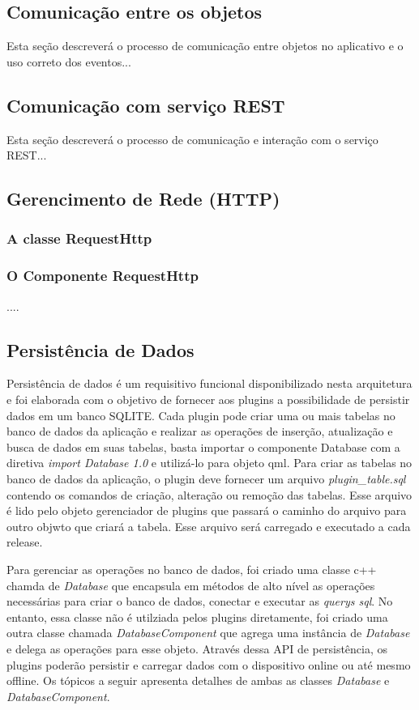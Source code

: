 \subsection{Comunicação entre os objetos}
Esta seção descreverá o processo de comunicação entre objetos no aplicativo e o uso correto dos eventos...


\subsection{Comunicação com serviço REST}
Esta seção descreverá o processo de comunicação e interação com o serviço REST...


\subsection{Gerencimento de Rede (HTTP)}\label{sec:solucao-desenvolvida}
\subsubsection{A classe RequestHttp}\label{sec:solucao-desenvolvida}
\subsubsection{O Componente RequestHttp}\label{sec:solucao-desenvolvida}
....


\subsection{Persistência de Dados}\label{sec:solucao-desenvolvida}
Persistência de dados é um requisitivo funcional disponibilizado nesta arquitetura e foi elaborada com o objetivo de fornecer aos plugins a possibilidade de persistir dados em um banco SQLITE. Cada plugin pode criar uma ou mais tabelas no banco de dados da aplicação e realizar as operações de inserção, atualização e busca de dados em suas tabelas, basta importar o componente Database com a diretiva \textit{import Database 1.0} e utilizá-lo para objeto qml. Para criar as tabelas no banco de dados da aplicação, o plugin deve fornecer um arquivo \textit{plugin\_table.sql} contendo os comandos de criação, alteração ou remoção das tabelas. Esse arquivo é lido pelo objeto gerenciador de plugins que passará o caminho do arquivo para outro objwto que criará a tabela. Esse arquivo será carregado e executado a cada release.\par

Para gerenciar as operações no banco de dados, foi criado uma classe c++ chamda de \textit{Database} que encapsula em métodos de alto nível as operações necessárias para criar o banco de dados, conectar e executar as \textit{querys sql}. No entanto, essa classe não é utilziada pelos plugins diretamente, foi criado uma outra classe chamada \textit{DatabaseComponent} que agrega uma instância de \textit{Database} e delega as operações para esse objeto. Através dessa API de persistência, os plugins poderão persistir e carregar dados com o dispositivo online ou até mesmo offline. Os tópicos a seguir apresenta detalhes de ambas as classes \textit{Database} e \textit{DatabaseComponent}.


